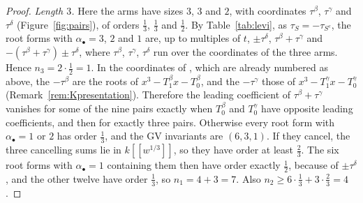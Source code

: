 \documentclass[11pt]{amsart}
\numberwithin{table}{section}
\numberwithin{figure}{section}
\numberwithin{equation}{section}
\theoremstyle{definition}
\theoremstyle{plain}
\newcommand{\bul}{\bullet}
\begin{document}
\begin{proof}
\emph{Length $3$.} Here the arms have sizes $3$, $3$ and $2$, with coordinates $\tau^\beta$, $\tau^\gamma$ and $\tau^\delta$ (Figure~\ref{fig:pairs}), of orders $\frac13$, $\frac13$ and $\frac12$. By Table~\ref{tab:levi}, as $\tau_S = -\tau_{S^c}$, the root forms with $\alpha_\bul = 3$, $2$ and $1$ are, up to multiples of $t$, $\pm\tau^\delta$, $\tau^\beta + \tau^\gamma$ and $-(\tau^\beta + \tau^\gamma) \pm \tau^\delta$, where $\tau^\beta$, $\tau^\gamma$, $\tau^\delta$ run over the coordinates of the three arms. Hence $n_3 = 2\cdot\frac12 = 1$. In the coordinates of \cite[Example~4.24]{K}, which are already numbered as above, the $-\tau^\beta$ are the roots of $x^3 - T_1^\beta x - T_0^\beta$, and the $-\tau^\gamma$ those of $x^3 - T_1^\gamma x - T_0^\gamma$ (Remark~\ref{rem:Kpresentation}). Therefore the leading coefficient of $\tau^\beta + \tau^\gamma$ vanishes for some of the nine pairs exactly when $T_0^\beta$ and $T_0^\gamma$ have opposite leading coefficients, and then for exactly three pairs. Otherwise every root form with $\alpha_\bul = 1$ or $2$ has order $\frac13$, and the GV invariants are $(6, 3, 1)$. If they cancel, the three cancelling sums lie in $k[[w^{1/3}]]$, so they have order at least $\frac23$. The six root forms with $\alpha_\bul = 1$ containing them then have order exactly $\frac12$, because of $\pm\tau^\delta$, and the other twelve have order $\frac13$, so $n_1 = 4 + 3 = 7$. Also $n_2 \ge 6\cdot\frac13 + 3\cdot\frac23 = 4$.


\end{proof}
\end{document}
